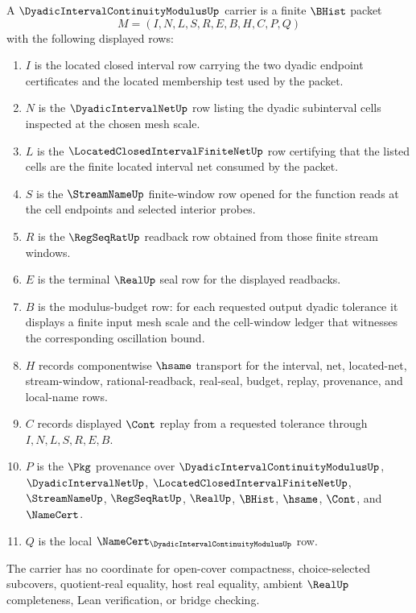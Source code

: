 \begin{definition}
\label{def:dyadic-interval-continuity-modulus-carrier}
A $\DyadicIntervalContinuityModulusUp$ carrier is a finite $\BHist$ packet
$$
M=(I,N,L,S,R,E,B,H,C,P,Q)
$$
with the following displayed rows:
\begin{enumerate}
\item $I$ is the located closed interval row carrying the two dyadic endpoint certificates and the located membership test used by the packet.
\item $N$ is the $\DyadicIntervalNetUp$ row listing the dyadic subinterval cells inspected at the chosen mesh scale.
\item $L$ is the $\LocatedClosedIntervalFiniteNetUp$ row certifying that the listed cells are the finite located interval net consumed by the packet.
\item $S$ is the $\StreamNameUp$ finite-window row opened for the function reads at the cell endpoints and selected interior probes.
\item $R$ is the $\RegSeqRatUp$ readback row obtained from those finite stream windows.
\item $E$ is the terminal $\RealUp$ seal row for the displayed readbacks.
\item $B$ is the modulus-budget row: for each requested output dyadic tolerance it displays a finite input mesh scale and the cell-window ledger that witnesses the corresponding oscillation bound.
\item $H$ records componentwise $\hsame$ transport for the interval, net, located-net, stream-window, rational-readback, real-seal, budget, replay, provenance, and local-name rows.
\item $C$ records displayed $\Cont$ replay from a requested tolerance through $I,N,L,S,R,E,B$.
\item $P$ is the $\Pkg$ provenance over $\DyadicIntervalContinuityModulusUp$, $\DyadicIntervalNetUp$, $\LocatedClosedIntervalFiniteNetUp$, $\StreamNameUp$, $\RegSeqRatUp$, $\RealUp$, $\BHist$, $\hsame$, $\Cont$, and $\NameCert$.
\item $Q$ is the local $\NameCert_{\DyadicIntervalContinuityModulusUp}$ row.
\end{enumerate}
The carrier has no coordinate for open-cover compactness, choice-selected subcovers, quotient-real equality, host real equality, ambient $\RealUp$ completeness, Lean verification, or bridge checking.
\end{definition}

